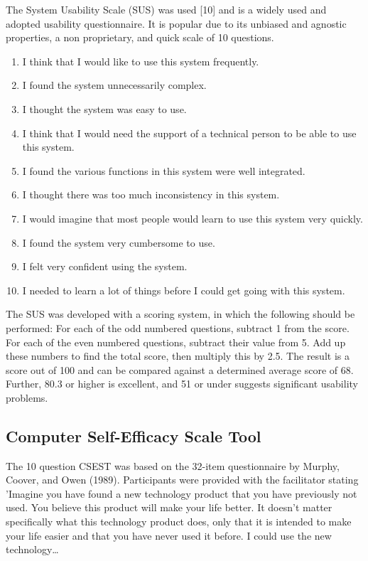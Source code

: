 \documentclass[a4paper, nobind]{templates/ociamthesis}
\providecommand{\tightlist}{%
  \setlength{\itemsep}{0pt}\setlength{\parskip}{0pt}}
\begin{document}
The System Usability Scale (SUS) was used {[}10{]} and is a widely used and adopted usability questionnaire.
It is popular due to its unbiased and agnostic properties, a non proprietary, and quick scale of 10 questions.

\begin{enumerate}
\def\labelenumi{\arabic{enumi}.}
\tightlist
\item
  I think that I would like to use this system frequently.
\item
  I found the system unnecessarily complex.
\item
  I thought the system was easy to use.
\item
  I think that I would need the support of a technical person to be able to use this system.
\item
  I found the various functions in this system were well integrated.
\item
  I thought there was too much inconsistency in this system.
\item
  I would imagine that most people would learn to use this system very quickly.
\item
  I found the system very cumbersome to use.
\item
  I felt very confident using the system.
\item
  I needed to learn a lot of things before I could get going with this system.
\end{enumerate}

The SUS was developed with a scoring system, in which the following should be performed: For each of the odd numbered questions, subtract 1 from the score.
For each of the even numbered questions, subtract their value from 5.
Add up these numbers to find the total score, then multiply this by 2.5.
The result is a score out of 100 and can be compared against a determined average score of 68.
Further, 80.3 or higher is excellent, and 51 or under suggests significant usability problems.

\hypertarget{computer-self-efficacy-scale-tool}{%
\subsection{Computer Self-Efficacy Scale Tool}\label{computer-self-efficacy-scale-tool}}

The 10 question CSEST was based on the 32-item questionnaire by Murphy, Coover, and Owen (1989).
Participants were provided with the facilitator stating 'Imagine you have found a new technology product that you have previously not used.
You believe this product will make your life better.
It doesn't matter specifically what this technology product does, only that it is intended to make your life easier and that you have never used it before.
I could use the new technology\ldots{}
\end{document}
